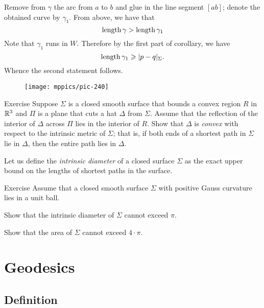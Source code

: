 Remove from $\gamma$ the arc from $a$ to $b$ and glue in the line segment $[ab]$;
denote the obtained curve by $\gamma_1$. 
From above, we have that
\[\mathop{\rm length}\nolimits\gamma>\mathop{\rm length}\nolimits \gamma_1\]
Note that $\gamma_1$ runs in $W$.
Therefore by the first part of corollary, we have
\[\mathop{\rm length}\nolimits \gamma_1\geqslant |p-q|_\Sigma.\]
Whence the second statement follows.
\qeds

\begin{wrapfigure}{r}{27 mm}
\vskip0mm
\centering
\texttt{[image: mppics/pic-240]}
\end{wrapfigure}

\begin{thm}{Exercise}\label{ex:hat-convex}
Suppose $\Sigma$ is a closed smooth surface that bounds a convex region $R$ 
in $\mathbb{R}^3$
and $\Pi$ is a plane that cuts a hat $\Delta$ from $\Sigma$.
Assume that the reflection of the interior of $\Delta$ across $\Pi$ lies in the interior of $R$.
Show that $\Delta$ is \emph{convex} with respect to the intrinsic metric  of $\Sigma$;
that is, 
if both ends of a shortest path in $\Sigma$ 
lie in $\Delta$,
then the entire path lies in $\Delta$.
\end{thm}


Let us define the \emph{intrinsic diameter} of a closed surface $\Sigma$ as the exact upper bound on the lengths of shortest paths in the surface.

\begin{thm}{Exercise}\label{ex:intrinsic-diameter}
Assume that a closed smooth surface $\Sigma$ with positive Gauss curvature lies in a unit ball.

\begin{subthm}{} Show that the intrinsic diameter of $\Sigma$ cannot exceed $\pi$.
 
\end{subthm}

\begin{subthm}{}
Show that the area of $\Sigma$ cannot exceed $4\cdot \pi$.
\end{subthm}

\end{thm}

\chapter{Geodesics}


\section{Definition}

